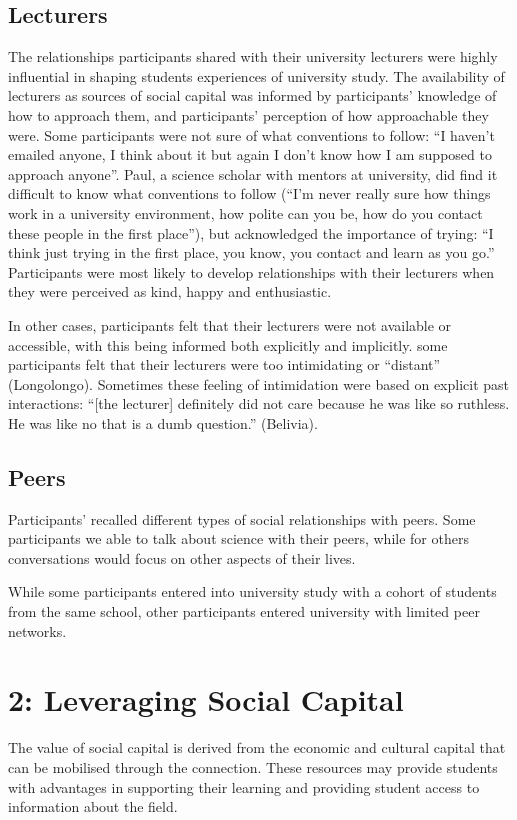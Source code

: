 \subsection{Lecturers}
The relationships participants shared with their university lecturers were highly influential in shaping students experiences of university study. The availability of lecturers as sources of social capital was informed by participants' knowledge of how to approach them, and participants' perception of how approachable they were. Some participants were not sure of what conventions to follow: ``I haven't emailed anyone, I think about it but again I don’t know how I am supposed to approach anyone''. Paul, a science scholar with mentors at university, did find it difficult to know what conventions to follow (``I'm never really sure how things work in a university environment, how polite can you be, how do you contact these people in the first place''), but acknowledged the importance of trying: ``I think just trying in the first place, you know, you contact and learn as you go.'' 
Participants were most likely to develop relationships with their lecturers when they were perceived as kind, happy and enthusiastic. 

In other cases, participants felt that their lecturers were not available or accessible, with this being informed both explicitly and implicitly. some participants felt that their lecturers were too intimidating or ``distant'' (Longolongo). Sometimes these feeling of intimidation were based on explicit past interactions: ``[the lecturer] definitely did not care because he was like so ruthless. He was like no that is a dumb question.'' (Belivia).



\subsection{Peers}
Participants' recalled different types of social relationships with peers. Some participants we able to talk about science with their peers, while for others conversations would focus on other aspects of their lives. 

While some participants entered into university study with a cohort of students from the same school, other participants entered university with limited peer networks.  


\section{2: Leveraging Social Capital}
The value of social capital is derived from the economic and cultural capital that can be mobilised through the connection. These resources may provide students with advantages in supporting their learning and providing student access to information about the field. 

